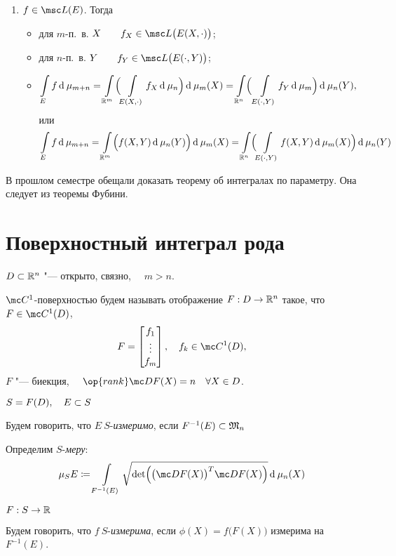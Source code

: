 \begin{theorem}
\begin{enumerate}
		\item $ f \in \msc L(E) $. Тогда
			\begin{itemize}
				\item для $ m $-п.~в. $ X \qquad f_X \in \msc L \bigl( E(X, \cdot) \bigr) $;
				\item для $ n $-п.~в. $ Y \qquad f_Y \in \msc L \bigl( E(\cdot, Y) \bigr) $;
				\item
					$$ \int\limits_E f \operatorname{d}^{} \mu_{m + n} = \int\limits_{\mathbb{R}^m} \Bigl( \int\limits_{E(X, \cdot)} f_X \operatorname{d}^{} \mu_n \Bigr) \operatorname{d}^{} \mu_m(X) = \int\limits_{\mathbb{R}^n} \Bigr(\int\limits_{E(\cdot, Y)} f_Y \operatorname{d}^{} \mu_m \Bigr) \operatorname{d}^{} \mu_n(Y), $$
					или
					$$ \int\limits_E f \operatorname{d}^{} \mu_{m + n} = \int\limits_{\mathbb{R}^m} \Bigl( f(X, Y) \operatorname{d}^{} \mu_n(Y) \Bigr) \operatorname{d}^{} \mu_m(X) = \int\limits_{\mathbb{R}^n} \Bigl( \int\limits_{E(\cdot, Y)} f(X, Y) \operatorname{d}^{} \mu_m(X) \Bigr) \operatorname{d}^{} \mu_n(Y) $$
			\end{itemize}
	\end{enumerate}
\end{theorem}

\begin{note}
	В прошлом семестре обещали доказать теорему об интегралах по параметру. Она следует из теоремы Фубини.
\end{note}

\section{Поверхностный интеграл  рода}

\begin{definition}
	$ D \subset \mathbb{R}^n $ "--- открыто, связно, $ \quad m > n $.

	$ \mc C^1 $-поверхностью будем называть отображение $ F : D \to \mathbb{R}^n $ такое, что $ F \in \mc C^1(D) $, \ie
	$$ F = \column{f_1}{f_m}, \quad f_k \in \mc C^1(D), $$
	$ F $ "--- биекция, $ \quad \op{rank} \mc DF(X) = n \quad \forall X \in D $.
\end{definition}

\begin{definition}
	$ S = F(D), \quad E \subset S $

	Будем говорить, что $ E ~ S $-\emph{измеримо}, если $ F^{-1}(E) \subset \mathfrak M_n $

	Определим $ S $-\emph{меру}:
	$$ \mu_S E \coloneq \int\limits_{F^{-1}(E)} \sqrt{\det \Bigl( \bigl( \mc DF(X) \bigr)^T \mc DF(X) \Bigr)} \di \mu_n(X) $$
\end{definition}

\begin{definition}
	$ F : S \to \mathbb{R} $

	Будем говорить, что $ f ~ S $-\emph{измерима}, если $ \phi(X) = f \bigl( F(X) \bigr) $ измерима на $ F^{-1}(E) $.
\end{definition}

